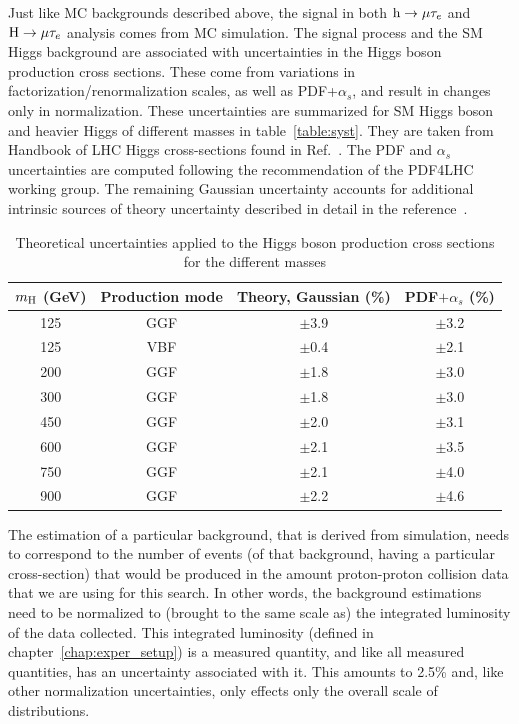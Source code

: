 Just like MC backgrounds described above, the signal in both $\text{h} \to \mu \tau_{e}$ and $\text{H} \to \mu \tau_{e}$ analysis comes from MC simulation. The signal process and the SM Higgs background are associated with uncertainties in the Higgs boson production cross sections. These come from variations in factorization/renormalization scales, as well as PDF+$\alpha_s$, and result in changes only in normalization. These uncertainties are summarized for SM Higgs boson and heavier Higgs of different masses in table~\ref{table:syst}. They are taken from Handbook of LHC Higgs cross-sections found in Ref.~\cite{YR4}. The PDF and $\alpha_s$ uncertainties are computed following the recommendation of the PDF4LHC working group. The remaining Gaussian uncertainty accounts for additional intrinsic sources of theory uncertainty described in detail in the reference~\cite{HIG-18-017}.

\begin{table}[!htbp]
  \begin{center}
  \caption{ Theoretical uncertainties applied to the Higgs boson production cross sections for the different masses}
  \begin{tabular} {cccc}
    \hline
    $m_{\text{H}}$  (GeV) &Production mode&Theory, Gaussian (\%) & PDF$+\alpha_s$  (\%)\\\hline
125 & GGF&$\pm$3.9
&$\pm$3.2\\
125 & VBF&$\pm$0.4
&$\pm$2.1\\
200 & GGF &$\pm$1.8
&$\pm$3.0\\
300&GGF&$\pm$1.8
&$\pm$3.0\\
450&GGF
&$\pm$2.0
&$\pm$3.1\\
600&GGF
&$\pm$2.1
&$\pm$3.5\\
750&GGF
&$\pm$2.1
&$\pm$4.0\\
900&GGF
&$\pm$2.2
&$\pm$4.6\\\hline
  \end{tabular}
  \label{tabe:syst_signal}
\end{center}
\end{table}



The estimation of a particular background, that is derived from simulation, needs to correspond to the number of events (of that background, having a particular cross-section) that would be produced in the amount proton-proton collision data that we are using for this search. In other words, the background estimations need to be normalized to (brought to the same scale as) the integrated luminosity of the data collected. This integrated luminosity (defined in chapter~\ref{chap:exper_setup}) is a measured quantity, and like all measured quantities, has an uncertainty associated with it. This amounts to 2.5\% and, like other normalization uncertainties, only effects only the overall scale of distributions.  




